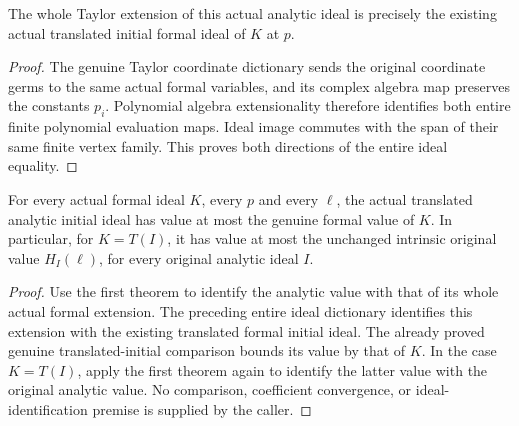 \begin{theorem}
\label{hir:actual-unshifted-translated-initial-formal-extension}
\leanok
The whole Taylor extension of this actual analytic ideal is precisely
the existing actual translated initial formal ideal of $K$ at $p$.
\end{theorem}
\begin{proof}
The genuine Taylor coordinate dictionary sends the original coordinate
germs to the same actual formal variables, and its complex algebra map
preserves the constants $p_i$. Polynomial algebra extensionality therefore
identifies both entire finite polynomial evaluation maps. Ideal image
commutes with the span of their same finite vertex family. This proves
both directions of the entire ideal equality.
\end{proof}

\begin{theorem}
\label{hir:actual-unshifted-translated-initial-all-hs}
\leanok
For every actual formal ideal $K$, every $p$ and every $\ell$, the actual
translated analytic initial ideal has value at most the genuine formal
value of $K$. In particular, for $K=T(I)$, it has value at most the
unchanged intrinsic original value $H_I(\ell)$, for every original
analytic ideal $I$.
\end{theorem}
\begin{proof}
Use the first theorem to identify the analytic value with that of its
whole actual formal extension. The preceding entire ideal dictionary
identifies this extension with the existing translated formal initial
ideal. The already proved genuine translated-initial comparison bounds
its value by that of $K$. In the case $K=T(I)$, apply the first theorem
again to identify the latter value with the original analytic value.
No comparison, coefficient convergence, or ideal-identification premise
is supplied by the caller.
\end{proof}
